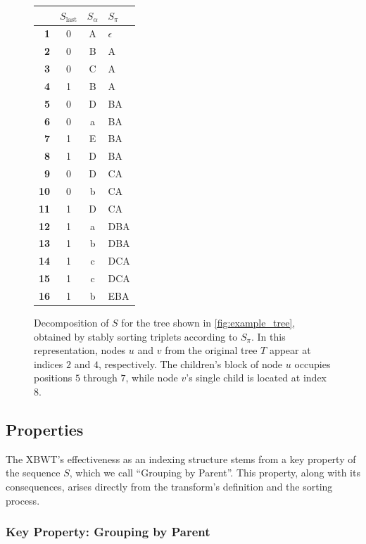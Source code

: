 \begin{figure}[ht]
    \centering
    \begin{tabular}{r c c l}
    \hline\hline
    \textbf{} & \textbf{$S_{\text{last}}$} & \textbf{$S_{\alpha}$} & \textbf{$S_{\pi}$} \\
    \hline
    \textbf{1} & 0 & A & $\epsilon$ \\
    \textbf{2} & 0 & B & A \\
    \textbf{3} & 0 & C & A \\
    \textbf{4} & 1 & B & A \\
    \textbf{5} & 0 & D & BA \\
    \textbf{6} & 0 & a & BA \\
    \textbf{7} & 1 & E & BA \\
    \textbf{8} & 1 & D & BA \\
    \textbf{9} & 0 & D & CA \\
    \textbf{10} & 0 & b & CA \\
    \textbf{11} & 1 & D & CA \\
    \textbf{12} & 1 & a & DBA \\
    \textbf{13} & 1 & b & DBA \\
    \textbf{14} & 1 & c & DCA \\
    \textbf{15} & 1 & c & DCA \\
    \textbf{16} & 1 & b & EBA \\
    \hline\hline
    \end{tabular}
    \caption{Decomposition of $S$ for the tree shown in \cref{fig:example_tree}, obtained by stably sorting triplets according to $S_\pi$. In this representation, nodes $u$ and $v$ from the original tree $T$ appear at indices $2$ and $4$, respectively. The children's block of node $u$ occupies positions $5$ through $7$, while node $v$'s single child is located at index $8$.}
    \label{tab:xbwt_example}
\end{figure}

\subsection{Properties}
The XBWT's effectiveness as an indexing structure stems from a key property of the sequence $S$, which we call ``Grouping by Parent''. This property, along with its consequences, arises directly from the transform's definition and the sorting process.

\subsubsection{Key Property: Grouping by Parent}

